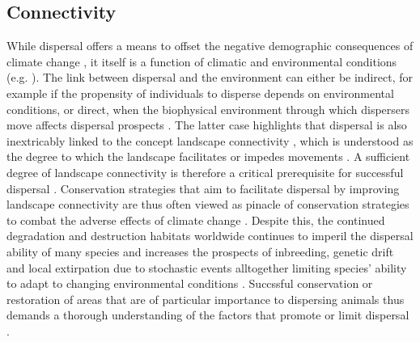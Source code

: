 \documentclass[abstract=on,10pt,a4paper,bibliography=totocnumbered]{article}
\begin{document}
\subsection{Connectivity}
While dispersal offers a means to offset the negative demographic consequences
of climate change \citep{Kokko.2006, Hodgson.2009, Travis.2013}, it itself is a
function of climatic and environmental conditions (e.g. \citep{Elliot.2014,
Behr.2020}). The link between dispersal and the environment can either be
indirect, for example if the propensity of individuals to disperse depends on
environmental conditions, or direct, when the biophysical environment through
which dispersers move affects dispersal prospects \citep{Travis.2013}. The
latter case highlights that dispersal is also inextricably linked to the concept
landscape connectivity \citep{Baguette.2013}, which is understood as the degree
to which the landscape facilitates or impedes movements \citep{Taylor.1993}. A
sufficient degree of landscape connectivity is therefore a critical prerequisite
for successful dispersal \citep{Fahrig.2003}. Conservation strategies that aim
to facilitate dispersal by improving landscape connectivity are thus often
viewed as pinacle of conservation strategies to combat the adverse effects of
climate change \citep{Heller.2009}. Despite this, the continued degradation and
destruction habitats worldwide continues to imperil the dispersal ability of
many species and increases the prospects of inbreeding, genetic drift and local
extirpation due to stochastic events \citep{Melbourne.2008, Sawyer.2011}
alltogether limiting species' ability to adapt to changing environmental
conditions \citep{Fahrig.2003}. Succssful conservation or restoration of areas
that are of particular importance to dispersing animals thus demands a thorough
understanding of the factors that promote or limit dispersal
\citep{Baguette.2013}.
\end{document}

